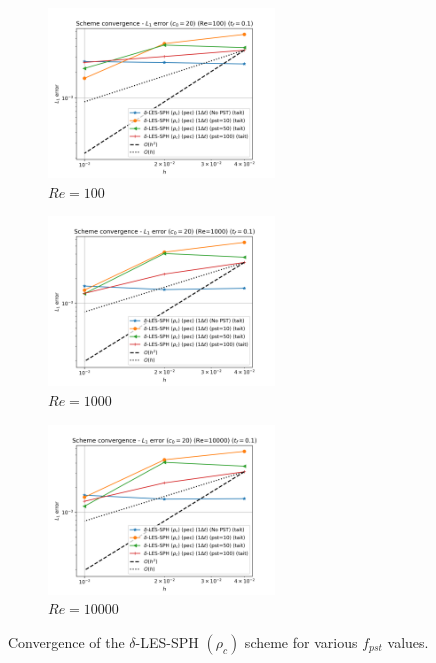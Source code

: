 \begin{figure}[H]
  \begin{subfigure}{7cm}
    \centering\includegraphics[width=6cm]{Code-Figures/deltales/pst/dt_pois_conv_c0_20_re_100.png}
    \caption{$Re = 100$}
  \end{subfigure}
  \begin{subfigure}{7cm}
    \centering\includegraphics[width=6cm]{Code-Figures/deltales/pst/dt_pois_conv_c0_20_re_1000.png}
    \caption{$Re = 1000$}
  \end{subfigure}
  \begin{subfigure}{7cm}
    \centering\includegraphics[width=6cm]{Code-Figures/deltales/pst/dt_pois_conv_c0_20_re_10000.png}
    \caption{$Re = 10000$}
  \end{subfigure}
  \caption{Convergence of the $\delta$-LES-SPH $(\rho_c)$ scheme for various $f_{pst}$ values.}
  \label{fig:deltales-pst}
\end{figure}

